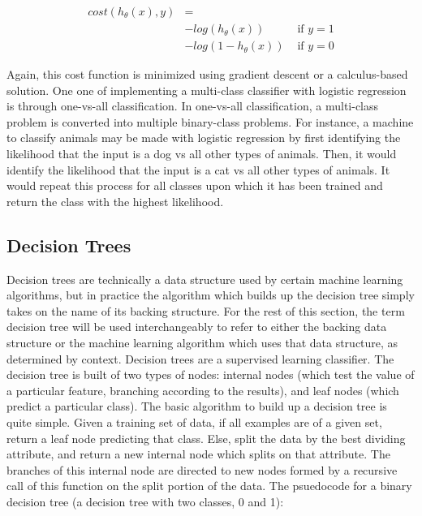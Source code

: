 \begin{align*} 
cost(h_\theta(x), y) &= \\
	& -log(h_\theta(x)) 	&\text{ if } y = 1\\
	& -log(1 - h_\theta(x))	&\text{ if } y = 0
\end{align*} 

Again, this cost function is minimized using gradient descent or a calculus-based solution. One one of implementing a multi-class classifier with logistic regression is through one-vs-all classification. In one-vs-all classification, a multi-class problem is converted into multiple binary-class problems. For instance, a machine to classify animals may be made with logistic regression by first identifying the likelihood that the input is a dog vs all other types of animals. Then, it would identify the likelihood that the input is a cat vs all other types of animals. It would repeat this process for all classes upon which it has been trained and return the class with the highest likelihood. 


\subsection{Decision Trees}

Decision trees are technically a data structure used by certain machine learning algorithms, but in practice the algorithm which builds up the decision tree simply takes on the name of its backing structure. For the rest of this section, the term decision tree will be used interchangeably to refer to either the backing data structure or the machine learning algorithm which uses that data structure, as determined by context. Decision trees are a supervised learning classifier. The decision tree is built of two types of nodes: internal nodes (which test the value of a particular feature, branching according to the results), and leaf nodes (which predict a particular class). The basic algorithm to build up a decision tree is quite simple. Given a training set of data, if all examples are of a given set, return a leaf node predicting that class. Else, split the data by the best dividing attribute, and return a new internal node which splits on that attribute. The branches of this internal node are directed to new nodes formed by a recursive call of this function on the split portion of the data. \cite{website:domingos} The psuedocode for a binary decision tree (a decision tree with two classes, 0 and 1):

